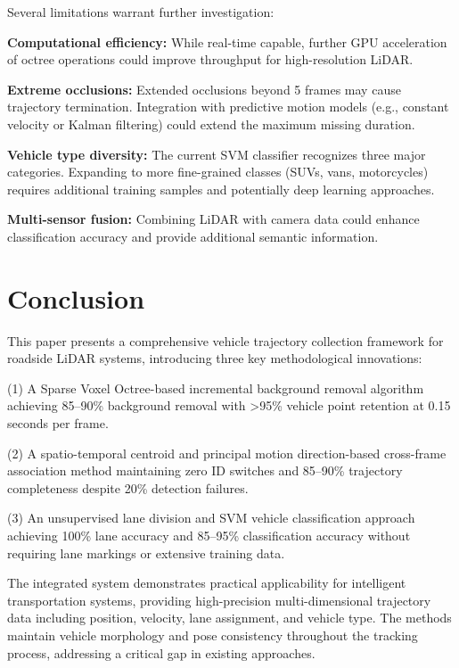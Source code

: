 \documentclass[numbered]{trbunofficial}
\begin{document}
Several limitations warrant further investigation:

\textbf{Computational efficiency:} While real-time capable, further GPU acceleration of octree operations could improve throughput for high-resolution LiDAR.

\textbf{Extreme occlusions:} Extended occlusions beyond 5 frames may cause trajectory termination. Integration with predictive motion models (e.g., constant velocity or Kalman filtering) could extend the maximum missing duration.

\textbf{Vehicle type diversity:} The current SVM classifier recognizes three major categories. Expanding to more fine-grained classes (SUVs, vans, motorcycles) requires additional training samples and potentially deep learning approaches.

\textbf{Multi-sensor fusion:} Combining LiDAR with camera data could enhance classification accuracy and provide additional semantic information.


\section{Conclusion}\label{sec:conclusion}

This paper presents a comprehensive vehicle trajectory collection framework for roadside LiDAR systems, introducing three key methodological innovations:

(1) A Sparse Voxel Octree-based incremental background removal algorithm achieving 85--90\% background removal with >95\% vehicle point retention at 0.15 seconds per frame.

(2) A spatio-temporal centroid and principal motion direction-based cross-frame association method maintaining zero ID switches and 85--90\% trajectory completeness despite 20\% detection failures.

(3) An unsupervised lane division and SVM vehicle classification approach achieving 100\% lane accuracy and 85--95\% classification accuracy without requiring lane markings or extensive training data.

The integrated system demonstrates practical applicability for intelligent transportation systems, providing high-precision multi-dimensional trajectory data including position, velocity, lane assignment, and vehicle type. The methods maintain vehicle morphology and pose consistency throughout the tracking process, addressing a critical gap in existing approaches.
\end{document}
